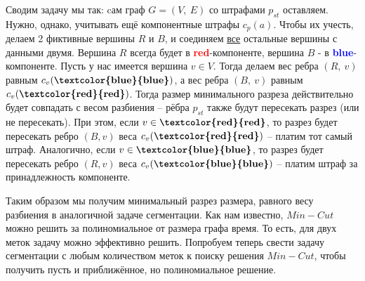 \documentclass[a4paper,12pt]{article}
\begin{document}
Сводим задачу мы так: cам граф $G = (V,\ E)$ со штрафами $p_{st}$ оставляем. Нужно, однако, учитывать ещё компонентные штрафы $c_p(a)$. Чтобы их учесть, делаем 2 фиктивные вершины $R$ и $B$, и соединяем \underline{все} остальные вершины с данными двумя. Вершина $R$ всегда будет в \textbf{\textcolor{red}{red}}-компоненте, вершина $B$ - в \textbf{\textcolor{blue}{blue}}-компоненте. Пусть у нас имеется вершина $v \in V$. Тогда делаем вес ребра $(R,\ v)$ равным $c_v(\textbf{\textcolor{blue}{blue}})$, а вес ребра $(B,\ v)$ равным $c_v(\textbf{\textcolor{red}{red}})$. Тогда размер минимального разреза действительно будет совпадать с весом разбиения -- рёбра $p_{st}$ также будут пересекать разрез (или не пересекать). При этом, если $v \in \textbf{\textcolor{red}{red}}$, то разрез будет пересекать ребро $(B, v)$ веса $c_v(\textbf{\textcolor{red}{red}})$ -- платим тот самый штраф. Аналогично, если $v \in \textbf{\textcolor{blue}{blue}}$, то разрез будет пересекать ребро $(R, v)$ веса $c_v(\textbf{\textcolor{blue}{blue}})$ -- платим штраф за принадлежность компоненте.

\begin{center}
\end{center}
Таким образом мы получим минимальный разрез размера, равного весу разбиения в аналогичной задаче сегментации.
Как нам известно, $Min-Cut$ можно решить за полиномиальное от размера графа время. То есть, для двух меток задачу можно эффективно решить. Попробуем теперь свести задачу сегментации с любым количеством меток к поиску решения $Min-Cut$, чтобы получить пусть и приближённое, но полиномиальное решение.
\end{document}
